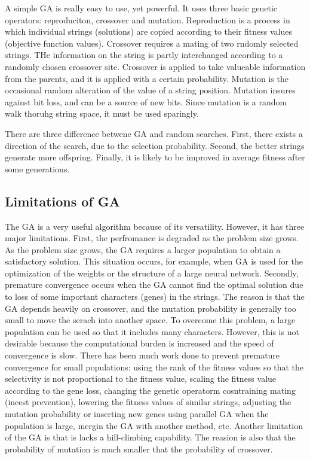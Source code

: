 \documentclass[pdftex,11pt]{article}
\begin{document}
A simple GA is really easy to use, yet powerful. It uses three basic genetic operators: reproduciton, crossover and mutation. Reproduction is a process in which individual strings (solutions) are copied according to their fitness values (objective function values). Crossover requires a mating of two rndomly selected strings. THe information on the string is partly interchanged according to a randomly chosen crossover site. Crossover is applied to take valueable information from the parents, and it is applied with a certain probability. Mutation is the occasional random alteration of the value of a string position. Mutation insures against bit loss, and can be a source of new bits. Since mutation is a random walk thoruhg string space, it must be used sparingly.

There are three difference betwene GA and random searches. First, there exists a direction of the search, due to the selection probability. Second, the better strings generate more offspring. Finally, it is likely to be improved in average fitness after some generations.

\subsection{Limitations of GA}
The GA is a very useful algorithm because of its versatility. However, it has three major limitations. First, the perfromance is degraded as the problem size grows. As the problem size grows, the GA requires a larger population to obtain a satisfactory solution. This situation occurs, for example, when GA is used for the optimization of the weights or the structure of a large neural network. Secondly, premature convergence occurs when the GA cannot find the optimal solution due to loss of some important characters (genes) in the strings. The reason is that the GA depends heavily on crossover, and the mutation probability is generally too small to move the serach into another space. To overcome this problem, a large population can be used so that it includes many characters. However, this is not desirable because the computational burden is increased and the speed of convergence is slow. There has been much work done to prevent premature convergence for small populations: using the rank of the fitness values so that the selectivity is not proportional to the fitness value, scaling the fitness value according to the gene loss, changing the genetic operatorm cosntraining mating (incest prevention), lowering the fitness values of similar strings, adjusting the mutation probability or inserting new genes using parallel GA when the population is large, mergin the GA with another method, etc. Another limitation of the GA is that is lacks a hill-climbing capability. The reasion is also that the probability of mutation is much smaller that the probability of crossover.
\end{document}

